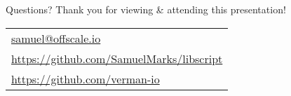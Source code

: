 \documentclass[aspectratio=169]{beamer}
\begin{document}
\begin{frame}{Questions?}
    \centering
  Thank you for viewing \& attending this presentation!

  \vspace{2em}
  \centering
  \begin{center}
    \begin{tabular}{l}
        \href{mailto:samuel@offscale.io}{samuel@offscale.io}\\
        \href{https://github.com/SamuelMarks/libscript}{https://github.com/SamuelMarks/libscript}\\
        \href{https://github.com/verman-io}{https://github.com/verman-io}
    \end{tabular}
  \end{center}
\end{frame}
\end{document}

